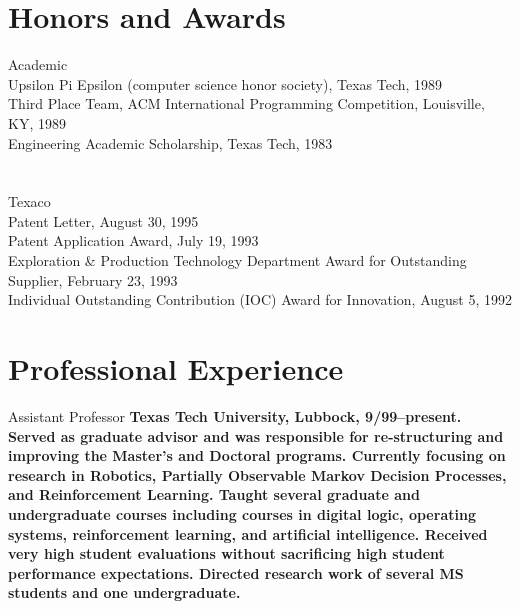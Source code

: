 \documentclass[11pt]{resume}
\begin{document}
\section{Honors and Awards}  
{Academic}   
{\\
Upsilon Pi Epsilon (computer science honor society), Texas Tech,
1989\\
Third Place Team, ACM International Programming Competition,
Louisville, KY,  1989\\
Engineering Academic Scholarship, Texas Tech, 1983}

\section{}
{Texaco}   
{\\Patent Letter, August 30, 1995\\
Patent Application Award, July 19, 1993 \\
Exploration \& Production Technology Department Award for 
Outstanding Supplier, February 23, 1993  \\
Individual Outstanding Contribution (IOC) Award for Innovation,
August 5, 1992}


\newcommand\tenure{\bf }

\section{Professional Experience}
{Assistant Professor} {\tenure Texas Tech University, Lubbock, 9/99--present.
  Served as graduate advisor and was responsible for re-structuring and
  improving the Master's and Doctoral programs.  Currently focusing on
  research in Robotics, Partially Observable Markov Decision Processes, and
  Reinforcement Learning.  Taught several graduate and undergraduate
  courses including courses in digital logic, operating systems,
  reinforcement learning, and artificial intelligence.  Received very high
  student evaluations without sacrificing high student performance
  expectations.  Directed research work of several MS students
  and one undergraduate.}
\end{document}
